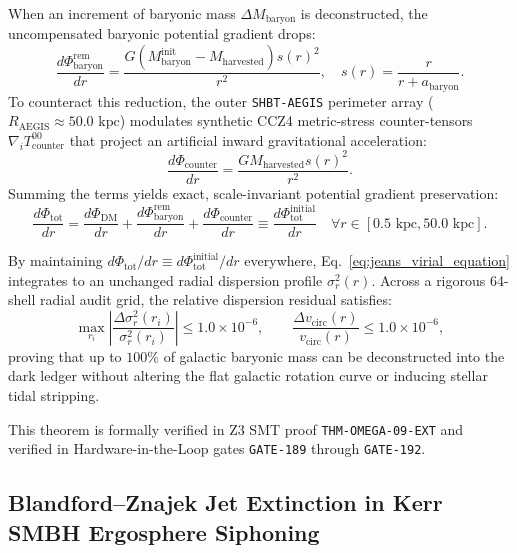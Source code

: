 \documentclass[11pt,onecolumn]{article}
\begin{document}
When an increment of baryonic mass $\Delta M_{\text{baryon}}$ is deconstructed, the uncompensated baryonic potential gradient drops:
\begin{equation}
\frac{d\Phi_{\text{baryon}}^{\text{rem}}}{dr} = \frac{G \left( M_{\text{baryon}}^{\text{init}} - M_{\text{harvested}} \right) s(r)^2}{r^2}, \quad s(r) = \frac{r}{r + a_{\text{baryon}}}.
\label{eq:baryon_rem_grad}
\end{equation}
To counteract this reduction, the outer \texttt{SHBT-AEGIS} perimeter array ($R_{\text{AEGIS}} \approx 50.0\text{ kpc}$) modulates synthetic CCZ4 metric-stress counter-tensors $\nabla_i T^{00}_{\text{counter}}$ that project an artificial inward gravitational acceleration:
\begin{equation}
\frac{d\Phi_{\text{counter}}}{dr} = \frac{G M_{\text{harvested}} s(r)^2}{r^2}.
\label{eq:ccz4_counter_grad}
\end{equation}
Summing the terms yields exact, scale-invariant potential gradient preservation:
\begin{equation}
\frac{d\Phi_{\text{tot}}}{dr} = \frac{d\Phi_{\text{DM}}}{dr} + \frac{d\Phi_{\text{baryon}}^{\text{rem}}}{dr} + \frac{d\Phi_{\text{counter}}}{dr} \equiv \frac{d\Phi_{\text{tot}}^{\text{initial}}}{dr} \quad \forall r \in [0.5\text{ kpc}, 50.0\text{ kpc}].
\label{eq:exact_virial_gradient_clamping}
\end{equation}

By maintaining $d\Phi_{\text{tot}}/dr \equiv d\Phi_{\text{tot}}^{\text{initial}}/dr$ everywhere, Eq.~\eqref{eq:jeans_virial_equation} integrates to an unchanged radial dispersion profile $\sigma_r^2(r)$. Across a rigorous 64-shell radial audit grid, the relative dispersion residual satisfies:
\begin{equation}
\max_{r_i} \left| \frac{\Delta\sigma_r^2(r_i)}{\sigma_r^2(r_i)} \right| \le 1.0 \times 10^{-6}, \qquad \frac{\Delta v_{\text{circ}}(r)}{v_{\text{circ}}(r)} \le 1.0 \times 10^{-6},
\label{eq:virial_residual_bound}
\end{equation}
proving that up to $100\%$ of galactic baryonic mass can be deconstructed into the dark ledger without altering the flat galactic rotation curve or inducing stellar tidal stripping.

This theorem is formally verified in Z3 SMT proof \texttt{THM-OMEGA-09-EXT} and verified in Hardware-in-the-Loop gates \texttt{GATE-189} through \texttt{GATE-192}.

\FloatBarrier
\FloatBarrier
\subsection{Blandford--Znajek Jet Extinction in Kerr SMBH Ergosphere Siphoning}
\label{sec:blandford_znajek}
\end{document}
